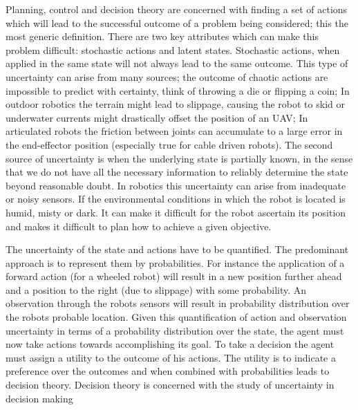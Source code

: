 Planning, control and decision theory are concerned with finding a set of actions which will lead to the 
successful outcome of a problem being considered; this the most generic definition. There are two 
key attributes which can make this problem difficult: stochastic actions and latent states. Stochastic 
actions, when applied in the same state will not always lead to the same outcome. This type of uncertainty 
can arise from many sources; the outcome of chaotic actions are impossible to predict with certainty, 
think of throwing a die or flipping a coin; In outdoor robotics the terrain might lead to slippage, causing 
the robot to skid or underwater currents might drastically offset the position of an UAV; In articulated 
robots the friction between joints can accumulate to a large error in the end-effector position (especially true 
for cable driven robots). 
The second source of uncertainty is when the underlying state is partially known, in the sense that we do not 
have all the necessary information to reliably determine the state beyond reasonable doubt. In robotics this 
uncertainty can arise from inadequate or noisy sensors. If the environmental conditions in which the robot 
is located is humid, misty or dark. It can make it difficult for the robot ascertain its position and 
makes it difficult to plan how to achieve a given objective.

The uncertainty of the state and actions have to be quantified. The predominant approach 
is to  represent them by probabilities. For instance the application of a forward action (for a wheeled robot) 
will result in a new position further ahead and a position to the right (due to slippage) with some probability.
An observation through the robots sensors will result in probability distribution over the robots probable location.
Given this quantification of action and observation uncertainty in terms of a probability distribution over the state, 
the agent must now take actions towards accomplishing its goal. To take a decision the agent must assign a utility 
to the outcome of his actions. The utility is to indicate a preference over the outcomes and when combined with 
probabilities leads to decision theory.  Decision theory is concerned with the study of uncertainty in decision 
making 



